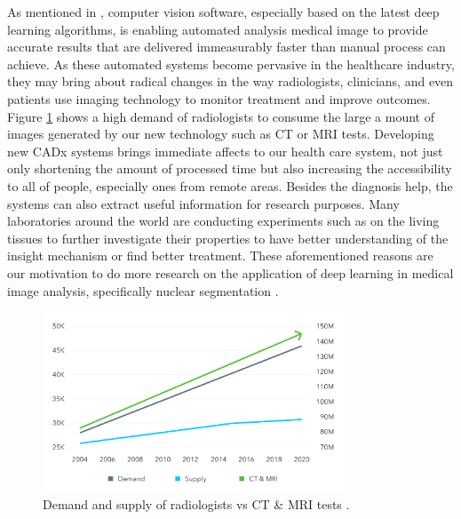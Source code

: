 As mentioned in \cite{needofcellseg}, computer vision software, especially based on the latest deep learning algorithms, is enabling automated analysis medical image to provide accurate results that are delivered immeasurably faster than manual process can achieve. As these automated systems become pervasive in the healthcare industry, they may bring about radical changes in the way radiologists, clinicians, and even patients use imaging technology to monitor treatment and improve outcomes. Figure \ref{fig:1_2_deman_supply} shows a high demand of radiologists to consume the large a mount of images generated by our new technology such as CT or MRI tests. Developing new CADx systems brings immediate affects to our health care system, not just only shortening the amount of processed time but also increasing the accessibility to all of people, especially ones from remote areas. Besides the diagnosis help, the systems can also extract useful information for research purposes. Many laboratories around the world are conducting experiments such as on the living tissues to further investigate their properties to have better understanding of the insight mechanism or find better treatment. These aforementioned reasons are our motivation to do more research on the application of deep learning in medical image analysis, specifically nuclear segmentation \cite{G-U-Net}.

\begin{figure}
    \centering
    \includegraphics[width=0.8\textwidth]{resources/1-2-demand-and-supply-of-radiologists.png}
    \caption{Demand and supply of radiologists vs CT \& MRI tests \cite{needofcellseg}.}
    \label{fig:1_2_deman_supply}
\end{figure}


